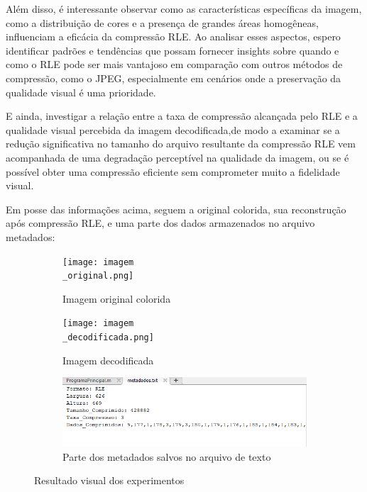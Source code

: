 \documentclass{article}
\begin{document}
Além disso, é interessante observar como as características específicas da imagem, como a distribuição de cores e a presença de grandes áreas homogêneas, influenciam a eficácia da compressão RLE. Ao analisar esses aspectos, espero identificar padrões e tendências que possam fornecer insights sobre quando e como o RLE pode ser mais vantajoso em comparação com outros métodos de compressão, como o JPEG, especialmente em cenários onde a preservação da qualidade visual é uma prioridade.

E ainda, investigar a relação entre a taxa de compressão alcançada pelo RLE e a qualidade visual percebida da imagem decodificada,de modo a examinar se a redução significativa no tamanho do arquivo resultante da compressão RLE vem acompanhada de uma degradação perceptível na qualidade da imagem, ou se é possível obter uma compressão eficiente sem comprometer muito a fidelidade visual.

Em posse das informações acima, seguem a original colorida, sua reconstrução após compressão RLE, e uma parte dos dados armazenados no arquivo metadados:

\begin{figure}[htbp]
    \centering
    \begin{subfigure}[b]{0.3\textwidth}
        \texttt{[image: imagem\\\_original.png]}
        \caption{Imagem original colorida }
        \label{fig:imagem1}
    \end{subfigure}
    \hfill
    \begin{subfigure}[b]{0.3\textwidth}
        \texttt{[image: imagem\\\_decodificada.png]}
        \caption{Imagem decodificada}
        \label{fig:imagem2}
    \end{subfigure}
    \hfill
    \begin{subfigure}[b]{0.3\textwidth}
        \includegraphics[width=\textwidth]{metadados.png}
        \caption{Parte dos metadados salvos no arquivo de texto}
        \label{fig:imagem3}
    \end{subfigure}
    \caption{Resultado visual dos experimentos}
    \label{fig:imagens}
\end{figure}
\end{document}
